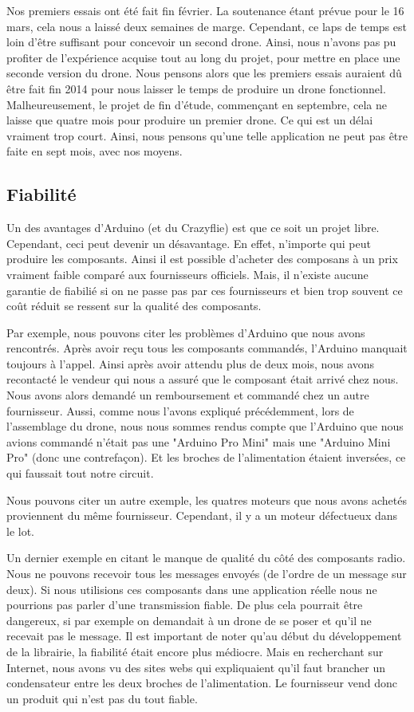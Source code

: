 \documentclass[a4paper,10pt]{report}
\begin{document}
	Nos premiers essais ont été fait fin février. La soutenance étant 
prévue pour le 16 mars, cela nous a laissé deux semaines de marge. Cependant, 
ce laps de temps est loin d'être suffisant pour concevoir un second drone. 
Ainsi, nous n'avons pas pu profiter de l'expérience acquise tout au long du 
projet, pour mettre en place une seconde version du drone. Nous pensons alors 
que les premiers essais auraient dû être fait fin 2014 pour nous laisser le 
temps de produire un drone fonctionnel. Malheureusement, le projet de fin 
d'étude, commençant en septembre, cela ne laisse que quatre mois pour produire 
un premier drone. Ce qui est un délai vraiment trop court. Ainsi, nous pensons 
qu'une telle application ne peut pas être faite en sept mois, avec nos moyens.
      
      \subsection{Fiabilité}
	Un des avantages d'Arduino (et du Crazyflie) est que ce soit un projet 
libre. Cependant, ceci peut devenir un désavantage. En effet, n'importe qui 
peut produire les composants. Ainsi il est possible d'acheter des composans à 
un prix vraiment faible comparé aux fournisseurs officiels. Mais, il n'existe 
aucune garantie de fiabilié si on ne passe pas par ces fournisseurs et bien 
trop souvent ce coût réduit se ressent sur la qualité des composants.
	
	Par exemple, nous pouvons citer les problèmes d'Arduino que nous avons 
rencontrés. Après avoir reçu tous les composants commandés, l'Arduino manquait 
toujours à l'appel. Ainsi après avoir attendu plus de deux mois, nous avons 
recontacté le vendeur qui nous a assuré que le composant était arrivé chez 
nous. Nous avons alors demandé un remboursement et commandé chez un autre 
fournisseur. Aussi, comme nous l'avons expliqué précédemment, lors de 
l'assemblage du drone, nous nous sommes rendus compte que l'Arduino que nous 
avions commandé n'était pas une "Arduino Pro Mini" mais une "Arduino Mini Pro" 
(donc une contrefaçon). Et les broches de l'alimentation étaient inversées, ce 
qui faussait tout notre circuit.

      Nous pouvons citer un autre exemple, les quatres moteurs que nous avons 
achetés proviennent du même fournisseur. Cependant, il y a un moteur défectueux 
dans le lot.

      Un dernier exemple en citant le manque de qualité du côté des composants 
radio. Nous ne pouvons recevoir tous les messages envoyés (de l'ordre de un 
message sur deux). Si nous utilisions ces composants dans une application 
réelle nous ne pourrions pas parler d'une transmission fiable. De plus cela 
pourrait être dangereux, si par exemple on demandait à un drone de se poser et 
qu'il ne recevait pas le message. Il est important de noter qu'au début du 
développement de la librairie, la fiabilité était encore plus médiocre. Mais en 
recherchant sur Internet, nous avons vu des sites webs qui expliquaient qu'il 
faut brancher un condensateur entre les deux broches de l'alimentation. Le 
fournisseur vend donc un produit qui n'est pas du tout fiable.
\end{document}
